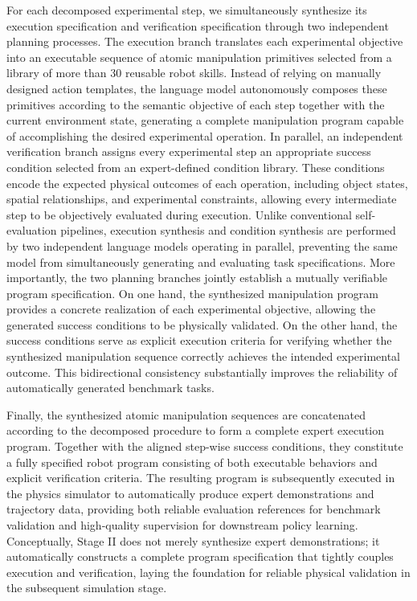 \documentclass[sigconf]{acmart}
\begin{document}
For each decomposed experimental step, we simultaneously synthesize its execution specification and verification specification through two independent planning processes. The execution branch translates each experimental objective into an executable sequence of atomic manipulation primitives selected from a library of more than 30 reusable robot skills. Instead of relying on manually designed action templates, the language model autonomously composes these primitives according to the semantic objective of each step together with the current environment state, generating a complete manipulation program capable of accomplishing the desired experimental operation. In parallel, an independent verification branch assigns every experimental step an appropriate success condition selected from an expert-defined condition library. These conditions encode the expected physical outcomes of each operation, including object states, spatial relationships, and experimental constraints, allowing every intermediate step to be objectively evaluated during execution. Unlike conventional self-evaluation pipelines, execution synthesis and condition synthesis are performed by two independent language models operating in parallel, preventing the same model from simultaneously generating and evaluating task specifications. More importantly, the two planning branches jointly establish a mutually verifiable program specification. On one hand, the synthesized manipulation program provides a concrete realization of each experimental objective, allowing the generated success conditions to be physically validated. On the other hand, the success conditions serve as explicit execution criteria for verifying whether the synthesized manipulation sequence correctly achieves the intended experimental outcome. This bidirectional consistency substantially improves the reliability of automatically generated benchmark tasks.

Finally, the synthesized atomic manipulation sequences are concatenated according to the decomposed procedure to form a complete expert execution program. Together with the aligned step-wise success conditions, they constitute a fully specified robot program consisting of both executable behaviors and explicit verification criteria. The resulting program is subsequently executed in the physics simulator to automatically produce expert demonstrations and trajectory data, providing both reliable evaluation references for benchmark validation and high-quality supervision for downstream policy learning. Conceptually, Stage II does not merely synthesize expert demonstrations; it automatically constructs a complete program specification that tightly couples execution and verification, laying the foundation for reliable physical validation in the subsequent simulation stage.
\end{document}
